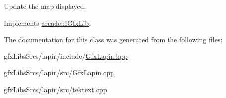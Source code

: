 Update the map displayed. 



Implements \hyperlink{classarcade_1_1_i_gfx_lib_addc883f69b75e6ec4927027aad94f5b5}{arcade\+::\+I\+Gfx\+Lib}.



The documentation for this class was generated from the following files\+:\begin{DoxyCompactItemize}
\item 
gfx\+Libs\+Srcs/lapin/include/\hyperlink{_gfx_lapin_8hpp}{Gfx\+Lapin.\+hpp}\item 
gfx\+Libs\+Srcs/lapin/src/\hyperlink{_gfx_lapin_8cpp}{Gfx\+Lapin.\+cpp}\item 
gfx\+Libs\+Srcs/lapin/src/\hyperlink{tektext_8cpp}{tektext.\+cpp}\end{DoxyCompactItemize}
